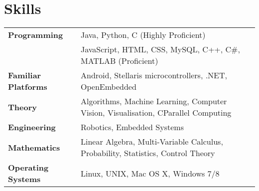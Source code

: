 \documentclass[10pt, a4paper]{report}
\newcommand{\teaching}[1]{}
\newcommand{\engineering}[1]{}
\renewcommand{\teaching}[1]{#1}
\renewcommand{\engineering}[1]{#1}
\newcommand{\sk}[3]{\subsubsection*{#1} {#2}{#3}}
\begin{document}
\section*{Skills}
\begin{tabular}{lp{14cm}}
{\bf Programming} &  Java, Python, C (Highly Proficient) \\  \addlinespace
{\bf } &  JavaScript, HTML, CSS, MySQL, C{\footnotesize ++}, C{\footnotesize \#}, MATLAB (Proficient) \\  \addlinespace
{\bf Familiar Platforms} & Android, Stellaris microcontrollers, .NET, OpenEmbedded  \\ \addlinespace
{\bf Theory} & Algorithms, Machine Learning, Computer Vision, Visualisation, CParallel Computing \\  \addlinespace
{\bf Engineering} & Robotics, Embedded Systems \\  \addlinespace
{\bf Mathematics} & Linear Algebra,  Multi-Variable Calculus, Probability, Statistics, Control Theory \\  \addlinespace
{\bf Operating Systems} &  Linux, UNIX, Mac OS X, Windows 7/8
\end{tabular}
\end{document}
